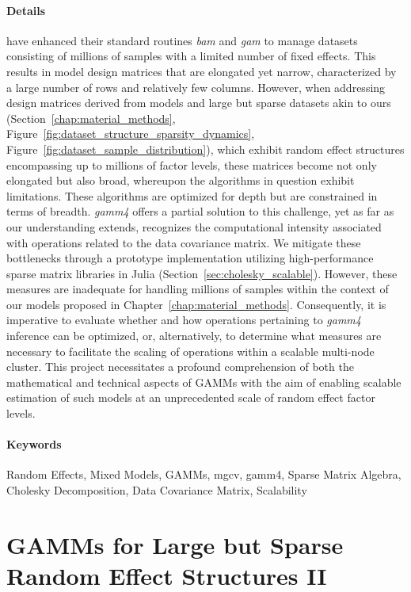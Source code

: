 \paragraph{Details} \cite{wood_generalized_2017} have enhanced their standard routines \textit{bam} and \textit{gam} to manage datasets consisting of millions of samples with a limited number of fixed effects. This results in model design matrices that are elongated yet narrow, characterized by a large number of rows and relatively few columns. However, when addressing design matrices derived from models and large but sparse datasets akin to ours (Section~\ref{chap:material_methods}, Figure~\ref{fig:dataset_structure_sparsity_dynamics}, Figure~\ref{fig:dataset_sample_distribution}), which exhibit random effect structures encompassing up to millions of factor levels, these matrices become not only elongated but also broad, whereupon the algorithms in question exhibit limitations. These algorithms are optimized for depth but are constrained in terms of breadth. \textit{gamm4} offers a partial solution to this challenge, yet as far as our understanding extends, \cite{wood_generalized_2017} recognizes the computational intensity associated with operations related to the data covariance matrix. We mitigate these bottlenecks through a prototype implementation utilizing high-performance sparse matrix libraries in Julia (Section~\ref{sec:cholesky_scalable}). However, these measures are inadequate for handling millions of samples within the context of our models proposed in Chapter~\ref{chap:material_methods}. Consequently, it is imperative to evaluate whether and how operations pertaining to \textit{gamm4} inference can be optimized, or, alternatively, to determine what measures are necessary to facilitate the scaling of operations within a scalable multi-node cluster. This project necessitates a profound comprehension of both the mathematical and technical aspects of GAMMs with the aim of enabling scalable estimation of such models at an unprecedented scale of random effect factor levels.

\paragraph{Keywords} Random Effects, Mixed Models, GAMMs, mgcv, gamm4, Sparse Matrix Algebra, Cholesky Decomposition, Data Covariance Matrix, Scalability

\newpage

\section{GAMMs for Large but Sparse Random Effect Structures II}
